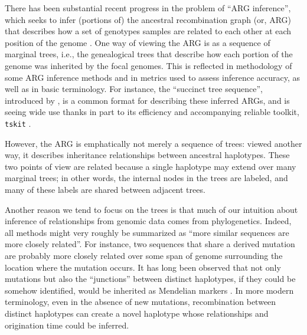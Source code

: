 \documentclass[10pt,twoside,lineno]{gsajnl}
\newcommand{\tskit}{\texttt{tskit}}
\begin{document}
There has been substantial recent progress
in the problem of ``ARG inference'',
which seeks to infer (portions of) the ancestral recombination graph (or, ARG)
that describes how a set of genotypes samples are related to each other
at each position of the genome \citep{speidel2019method,kelleher2019inferring,zhang2023biobankscale,deng2024robust,lewanski2024introduction}.
One way of viewing the ARG is as a sequence of marginal trees,
i.e., the genealogical trees that describe how each portion of the genome
was inherited by the focal genomes.
This is reflected in methodology of some ARG inference methods
and in metrics used to assess inference accuracy,
as well as in basic terminology.
For instance, 
the ``succinct tree sequence'',
introduced by \citet{kelleher2016efficient},
is a common format for describing these inferred ARGs,
and is seeing wide use thanks in part to its efficiency and accompanying reliable toolkit,
\tskit{} \citep{tskit,ralph2020efficiently}.

However, the ARG is emphatically not merely a sequence of trees:
viewed another way, it describes inheritance relationships between ancestral haplotypes.
These two points of view are related because a single haplotype
may extend over many marginal trees;
in other words, the internal nodes in the trees are labeled, and many of these labels
are shared between adjacent trees.

Another reason we tend to focus on the trees is that
much of our intuition about inference of relationships from genomic data
comes from phylogenetics.
Indeed, all methods might very roughly be summarized as
``more similar sequences are more closely related''.
For instance, two sequences that share a derived mutation
are probably more closely related over some span of genome surrounding the location where the mutation occurs.
It has long been observed 
that not only mutations
but also the ``junctions'' between distinct haplotypes,
if they could be somehow identified,
would be inherited as Mendelian markers
\citep{fisher1954fuller,chapman2003model}.
In more modern terminology, 
even in the absence of new mutations,
recombination between distinct haplotypes can create a novel haplotype
whose relationships and origination time could be inferred.
\end{document}

